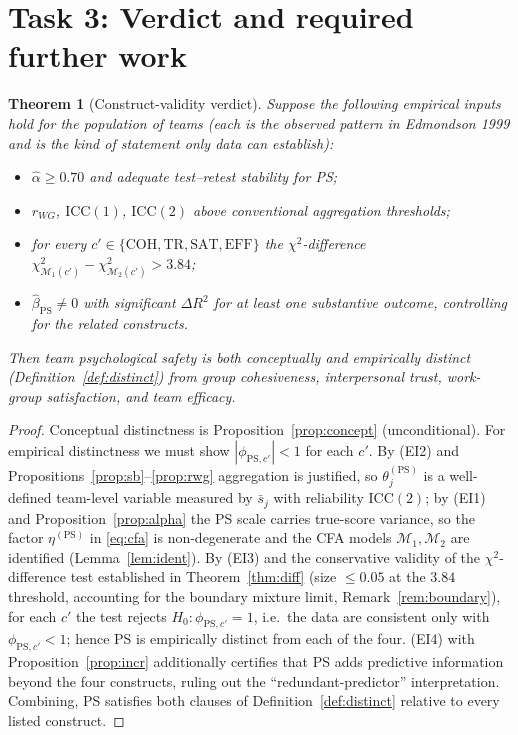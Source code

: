 \documentclass{amsart}
\newtheorem{theorem}{Theorem}
\theoremstyle{remark}
\begin{document}
\section{Task 3: Verdict and required further work}\label{sec:verdict}

\begin{theorem}[Construct-validity verdict]\label{thm:verdict}
Suppose the following empirical inputs hold for the population of teams (each is the
observed pattern in Edmondson 1999 and is the kind of statement only data can
establish):
\begin{itemize}
\item[(EI1)] $\hat\alpha\ge0.70$ and adequate test--retest stability for PS;
\item[(EI2)] $r_{WG}$, $\mathrm{ICC}(1)$, $\mathrm{ICC}(2)$ above conventional
aggregation thresholds;
\item[(EI3)] for every $c'\in\{\mathrm{COH,TR,SAT,EFF}\}$ the $\chi^2$-difference
$\chi^2_{\mathcal M_1(c')}-\chi^2_{\mathcal M_2(c')}>3.84$;
\item[(EI4)] $\hat\beta_{\mathrm{PS}}\neq0$ with significant $\Delta R^2$ for at
least one substantive outcome, controlling for the related constructs.
\end{itemize}
Then team psychological safety is \emph{both conceptually and empirically distinct}
(Definition~\ref{def:distinct}) from group cohesiveness, interpersonal trust,
work-group satisfaction, and team efficacy.
\end{theorem}
\begin{proof}
Conceptual distinctness is Proposition~\ref{prop:concept} (unconditional). For
empirical distinctness we must show $|\phi_{\mathrm{PS},c'}|<1$ for each $c'$.
By (EI2) and Propositions~\ref{prop:sb}--\ref{prop:rwg} aggregation is justified, so
$\theta^{(\mathrm{PS})}_j$ is a well-defined team-level variable measured by
$\bar s_j$ with reliability $\mathrm{ICC}(2)$; by (EI1) and
Proposition~\ref{prop:alpha} the PS scale carries true-score variance, so the
factor $\eta^{(\mathrm{PS})}$ in \eqref{eq:cfa} is non-degenerate and the CFA models
$\mathcal M_1,\mathcal M_2$ are identified (Lemma~\ref{lem:ident}). By (EI3) and the
conservative validity of the $\chi^2$-difference test established in
Theorem~\ref{thm:diff} (size $\le0.05$ at the $3.84$ threshold, accounting for the
boundary mixture limit, Remark~\ref{rem:boundary}), for each $c'$ the test rejects
$H_0:\phi_{\mathrm{PS},c'}=1$, i.e.\ the data are consistent only
with $\phi_{\mathrm{PS},c'}<1$; hence PS is empirically distinct from each of the
four. (EI4) with Proposition~\ref{prop:incr} additionally certifies that PS adds
predictive information beyond the four constructs, ruling out the
``redundant-predictor'' interpretation. Combining, PS satisfies both clauses of
Definition~\ref{def:distinct} relative to every listed construct. \end{proof}
\end{document}
